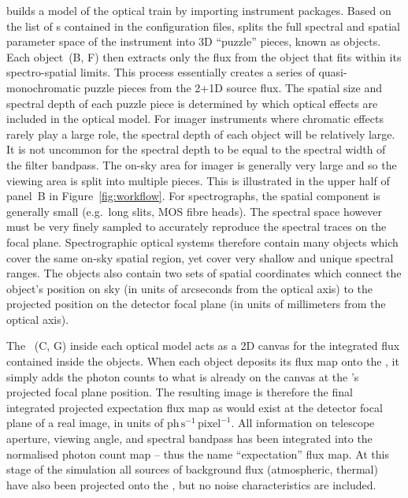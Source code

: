 \ScopeSim{} builds a model of the optical train by importing instrument packages.
Based on the list of \Effect{}s contained in the configuration files, \ScopeSim{} splits the full spectral and spatial parameter space of the instrument into 3D ``puzzle'' pieces, known as \FieldOfView{} objects.
Each \FieldOfView{} object~(B, F) then extracts only the flux from the \Source{} object that fits within its spectro-spatial limits.
This process essentially creates a series of quasi-monochromatic puzzle pieces from the 2+1D source flux.
The spatial size and spectral depth of each puzzle piece is determined by which optical effects are included in the optical model.
For imager instruments where chromatic effects rarely play a large role, the spectral depth of each \FieldOfView{} object will be relatively large.
It is not uncommon for the spectral depth to be equal to the spectral width of the filter bandpass.
The on-sky area for imager is generally very large and so the viewing area is split into multiple pieces.
This is illustrated in the upper half of panel~B in Figure~\ref{fig:workflow}.
For spectrographs, the spatial component is generally small (e.g.~long slits, MOS fibre heads).
The spectral space however must be very finely sampled to accurately reproduce the spectral traces on the focal plane.
Spectrographic optical systems therefore contain many \FieldOfView{} objects which cover the same on-sky spatial region, yet cover very shallow and unique spectral ranges.
The \FieldOfView{} objects also contain two sets of spatial coordinates which connect the object's position on sky (in units of arcseconds from the optical axis) to the projected position on the detector focal plane (in units of millimeters from the optical axis).

The \ImagePlane{}~(C, G) inside each optical model acts as a 2D canvas for the integrated flux contained inside the \FieldOfView{} objects.
When each \FieldOfView{} object deposits its flux map onto the \ImagePlane{}, it simply adds the photon counts to what is already on the canvas at the \FieldOfView{}'s projected focal plane position.
The resulting \ImagePlane{} image is therefore the final integrated projected expectation flux map as would exist at the detector focal plane of a real image, in units of $\mathrm{ph\,s^{-1}\,pixel^{-1}}$.
All information on telescope aperture, viewing angle, and spectral bandpass has been integrated into the normalised photon count map -- thus the name ``expectation'' flux map.
At this stage of the simulation all sources of background flux (atmospheric, thermal) have also been projected onto the \ImagePlane{}, but no noise characteristics are included.

